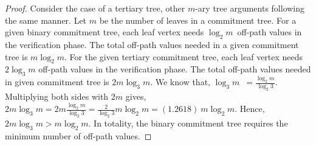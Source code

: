 	\begin{proof}
		Consider the case of a tertiary tree, other $m$-ary tree arguments following the same manner.
		Let $m$ be the number of leaves in a commitment tree.
		For a given binary commitment tree, each leaf vertex needs $\log_2 m$\ off-path values in the verification phase.
		The total off-path values needed in a given commitment tree is ${m \log_2 m}$.
		For the given tertiary commitment tree, each leaf vertex needs $2 \log_3 m$ off-path values in the verification phase.
		The total off-path values needed in given commitment tree is $2 m \log_3 m$.
		We know that, $\log_3 m$\  $= \frac{ {\log _2 m } }{{\log _2  3 }}$. 
		Multiplying both sides with  $2m$  gives, $2m\log_3 m = 2m\frac{ {\log _2 m } }{{\log _2  3 }} = \frac{ {2 } } {{\log _2  3 }}m\log _2 m = (1.2618)\ m\log _2 m$.
		Hence, $2m\log_3 m > m\log _2 m$. 
		In totality, the binary commitment tree requires the minimum number of off-path values.
	\end{proof}
